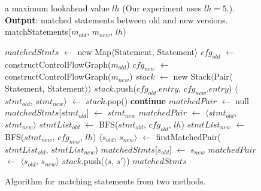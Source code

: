 \begin{figure}[t]
\quad a maximum lookahead value $\mathit{lh}$ (Our experiment uses $\mathit{lh}=5$.).\\
\textbf{Output}: matched statements between old and new versions.
\vspace{-4mm}%
matchStatements($\mathit{m_{old}}$, $\mathit{m_{new}}$, $\mathit{lh}$)\\
\begin{algorithmic}[1]
\STATE $\mathit{matchedStmts}$ $\leftarrow$ new Map$\langle$Statement, Statement$\rangle$
\STATE $\mathit{cfg_{old}}$ $\leftarrow$ constructControlFlowGraph($\mathit{m_{old}}$)
\STATE $\mathit{cfg_{new}}$ $\leftarrow$ constructControlFlowGraph($\mathit{m_{new}}$)
\STATE $\mathit{stack}$ $\leftarrow$ new Stack$\langle$Pair$\langle$Statement, Statement$\rangle$$\rangle$
\STATE $\mathit{stack}$.push($\mathit{cfg_{old}}$.$\mathit{entry}$, $\mathit{cfg_{new}}$.$\mathit{entry}$)
\STATE $\langle$$\mathit{stmt_{old}}$, $\mathit{stmt_{new}}$$\rangle$ $\leftarrow$ $\mathit{stack}$.pop()
\STATE \textbf{continue}
\ENDIF
\STATE $\mathit{matchedPair}$ $\leftarrow$ null
\STATE $\mathit{matchedStmts}$[$\mathit{stmt_{old}}$] $\leftarrow$ $\mathit{stmt_{new}}$
\STATE $\mathit{matchedPair}$ $\leftarrow$ $\langle$$\mathit{stmt_{old}}$, $\mathit{stmt_{new}}$$\rangle$
\ELSE
\STATE $\mathit{stmtList_{old}}$ $\leftarrow$ BFS($\mathit{stmt_{old}}$, $\mathit{cfg_{old}}$, $\mathit{lh}$)
\STATE $\mathit{stmtList_{new}}$ $\leftarrow$ BFS($\mathit{stmt_{new}}$, $\mathit{cfg_{new}}$, $\mathit{lh}$)
\STATE $\langle$$\mathit{s_{old}}$, $\mathit{s_{new}}$$\rangle$ $\leftarrow$ firstMatchedPair($\mathit{stmtList_{old}}$, $\mathit{stmtList_{new}}$)
\STATE $\mathit{matchedStmts}$[$\mathit{s_{old}}$] $\leftarrow$ $\mathit{s_{new}}$
\STATE $\mathit{matchedPair}$ $\leftarrow$ $\langle$$\mathit{s_{old}}$, $\mathit{s_{new}}$$\rangle$
\ENDIF
\ENDIF
{}
\STATE $\mathit{stack}$.push($\langle$$\mathit{s}$, $\mathit{s'}$$\rangle$)
\ENDFOR
\ENDFOR
\ENDIF
\ENDWHILE
\RETURN $\mathit{matchedStmts}$
\end{algorithmic}
\vspace{-2mm}
\caption{Algorithm for matching statements from two methods.
\label{fig:matching}
}
\end{figure}
